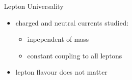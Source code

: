 \begin{frame}{Lepton Universality}
    \begin{itemize}
        \item charged and neutral currents studied: \medskip
        \begin{itemize}
            \item inpependent of mass \medskip
            \item constant coupling to all leptons  \medskip
        \end{itemize}
        \item [\rightarrow] lepton flavour does not matter \medskip
    \end{itemize}
\end{frame}